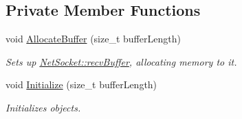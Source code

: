 \subsection*{Private Member Functions}
\begin{DoxyCompactItemize}
\item 
void \hyperlink{class_net_socket_a8eeea3a43d5eeeb3a7a12cdcc8a5fc64}{AllocateBuffer} (size\_\-t bufferLength)
\begin{DoxyCompactList}\small\item\em Sets up \hyperlink{class_net_socket_a0565a5dafc4df4589c0013d0c2816f33}{NetSocket::recvBuffer}, allocating memory to it. \item\end{DoxyCompactList}\item 
void \hyperlink{class_net_socket_a9d149d9ffbfe8d2240f664fd1923eb74}{Initialize} (size\_\-t bufferLength)
\begin{DoxyCompactList}\small\item\em Initializes objects. \item\end{DoxyCompactList}\end{DoxyCompactItemize}
